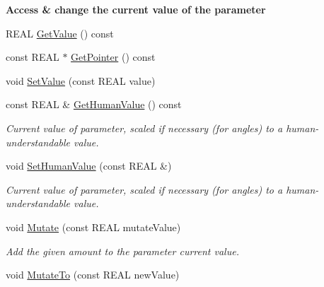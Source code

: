 \begin{Indent}\textbf{ Access \& change the current value of the parameter}\par
\begin{DoxyCompactItemize}
\item 
R\+E\+AL \mbox{\hyperlink{class_obj_cryst_1_1_refinable_par_a477cf548ff273fa1487b74a2c47af664}{Get\+Value}} () const
\item 
const R\+E\+AL $\ast$ \mbox{\hyperlink{class_obj_cryst_1_1_refinable_par_a675b8d257ac8e88efd2eb47cd478ad99}{Get\+Pointer}} () const
\item 
void \mbox{\hyperlink{class_obj_cryst_1_1_refinable_par_a55a87d842fc046b2f4b3c03c92e53052}{Set\+Value}} (const R\+E\+AL value)
\item 
\mbox{\label{class_obj_cryst_1_1_refinable_par_abbe1411e502e1c1203d66a3d5279ad6a}} 
const R\+E\+AL \& \mbox{\hyperlink{class_obj_cryst_1_1_refinable_par_abbe1411e502e1c1203d66a3d5279ad6a}{Get\+Human\+Value}} () const
\begin{DoxyCompactList}\small\item\em Current value of parameter, scaled if necessary (for angles) to a human-\/understandable value. \end{DoxyCompactList}\item 
\mbox{\label{class_obj_cryst_1_1_refinable_par_a6bb727ce1de6de9e56c46be1ba75f8b9}} 
void \mbox{\hyperlink{class_obj_cryst_1_1_refinable_par_a6bb727ce1de6de9e56c46be1ba75f8b9}{Set\+Human\+Value}} (const R\+E\+AL \&)
\begin{DoxyCompactList}\small\item\em Current value of parameter, scaled if necessary (for angles) to a human-\/understandable value. \end{DoxyCompactList}\item 
void \mbox{\hyperlink{class_obj_cryst_1_1_refinable_par_abd6a06bbb5eb59d80515ebdad2612da8}{Mutate}} (const R\+E\+AL mutate\+Value)
\begin{DoxyCompactList}\small\item\em Add the given amount to the parameter current value. \end{DoxyCompactList}\item 
void \mbox{\hyperlink{class_obj_cryst_1_1_refinable_par_a696f87a0a129cfd270144532d664d093}{Mutate\+To}} (const R\+E\+AL new\+Value)
\item 

\end{DoxyCompactItemize}
\end{Indent}
